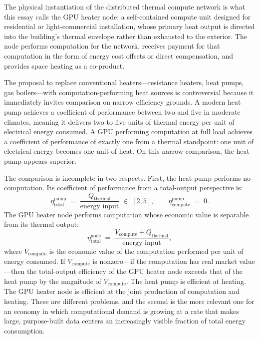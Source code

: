 \documentclass[12pt, oneside]{article}
\begin{document}
The physical instantiation of the distributed thermal compute network is what this essay calls the GPU heater node: a self-contained compute unit designed for residential or light-commercial installation, whose primary heat output is directed into the building's thermal envelope rather than exhausted to the exterior. The node performs computation for the network, receives payment for that computation in the form of energy cost offsets or direct compensation, and provides space heating as a co-product.

The proposal to replace conventional heaters---resistance heaters, heat pumps, gas boilers---with computation-performing heat sources is controversial because it immediately invites comparison on narrow efficiency grounds. A modern heat pump achieves a coefficient of performance between two and five in moderate climates, meaning it delivers two to five units of thermal energy per unit of electrical energy consumed. A GPU performing computation at full load achieves a coefficient of performance of exactly one from a thermal standpoint: one unit of electrical energy becomes one unit of heat. On this narrow comparison, the heat pump appears superior.

The comparison is incomplete in two respects. First, the heat pump performs no computation. Its coefficient of performance from a total-output perspective is:
\[
\eta_{\text{total}}^{\text{pump}} \;=\; \frac{Q_{\text{thermal}}}{\text{energy input}} \;\in\; [2,5], \qquad \eta_{\text{compute}}^{\text{pump}} \;=\; 0.
\]
The GPU heater node performs computation whose economic value is separable from its thermal output:
\[
\eta_{\text{total}}^{\text{node}} \;=\; \frac{V_{\text{compute}} + Q_{\text{thermal}}}{\text{energy input}},
\]
where $V_{\text{compute}}$ is the economic value of the computation performed per unit of energy consumed. If $V_{\text{compute}}$ is nonzero---if the computation has real market value---then the total-output efficiency of the GPU heater node exceeds that of the heat pump by the magnitude of $V_{\text{compute}}$. The heat pump is efficient at heating. The GPU heater node is efficient at the joint production of computation and heating. These are different problems, and the second is the more relevant one for an economy in which computational demand is growing at a rate that makes large, purpose-built data centers an increasingly visible fraction of total energy consumption.
\end{document}

